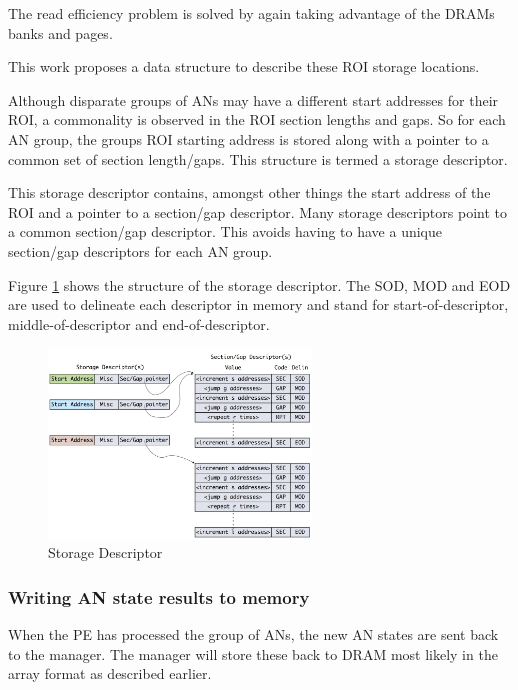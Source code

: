 \documentclass[journal]{IEEEtran}
\begin{document}
The read efficiency problem is solved by again taking advantage of the DRAMs banks and pages.

This work proposes a data structure to describe these ROI storage locations.

Although disparate groups of ANs may have a different start addresses for their ROI, a commonality is observed in the ROI section lengths and gaps. So for each AN group, the groups ROI starting address is stored along with a pointer to a common set of section length/gaps. This structure is termed a storage descriptor.

This storage descriptor contains, amongst other things the start address of the ROI and a pointer to a section/gap descriptor. Many storage descriptors point to a common section/gap descriptor. This avoids having to have a unique section/gap descriptors for each AN group.

Figure \ref{fig:storageDescriptor} shows the structure of the storage descriptor. The SOD, MOD and EOD are used to delineate each descriptor in memory and stand for start-of-descriptor, middle-of-descriptor and end-of-descriptor.

\begin{figure}[!t]
\centerline{
\mbox{\includegraphics[width=2.75in]{storageDesc.jpg}}
}
\caption{Storage Descriptor}
\label{fig:storageDescriptor}
\end{figure}

\subsubsection{Writing AN state results to memory}
\label{ssec:writingANStates}

When the PE has processed the group of ANs, the new AN states are sent back to the manager. The manager will store these back to DRAM most likely in the array format as described earlier.
\end{document}
